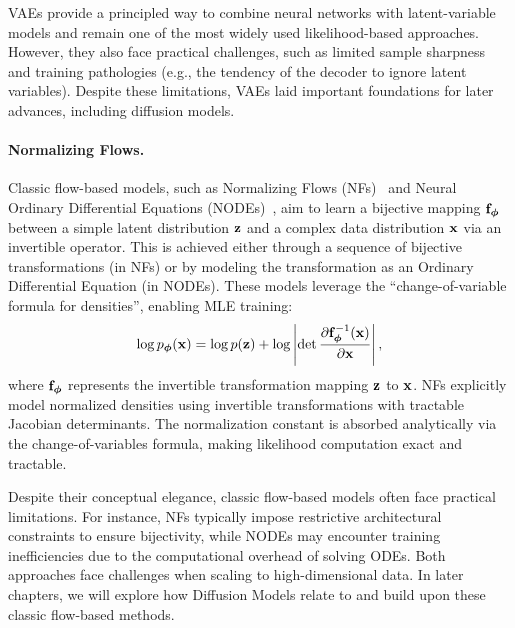 VAEs provide a principled way to combine neural networks with latent-variable models and remain one of the most widely used likelihood-based approaches. 
However, they also face practical challenges, such as limited sample sharpness and training pathologies (e.g., the tendency of the decoder to ignore latent variables). 
Despite these limitations, VAEs laid important foundations for later advances, including diffusion models.






\paragraph{Normalizing Flows.}
Classic flow-based models, such as Normalizing Flows (NFs)~\citep{rezende2015variational} and Neural Ordinary Differential Equations (NODEs)~\citep{chen2018neural}, aim to learn a bijective mapping ${\mathbf{f}}_{\bm{\phi}}$ between a simple latent distribution $ {\mathbf{z}} $ and a complex data distribution $ {\mathbf{x}} $ via an invertible operator. This is achieved either through a sequence of bijective transformations (in NFs) or by modeling the transformation as an Ordinary Differential Equation (in NODEs). These models leverage the ``change-of-variable formula for densities'', enabling MLE training:
\begin{equation*}
    \log p_{\bm{\phi}}({\mathbf{x}}) = \log p({\mathbf{z}}) + \log \left| \det \frac{\partial {\mathbf{f}}_{\bm{\phi}}^{-1}({\mathbf{x}})}{\partial {\mathbf{x}}} \right|,
\end{equation*}
where $ {\mathbf{f}}_{\bm{\phi}} $ represents the invertible transformation mapping $ {\mathbf{z}} $ to $ {\mathbf{x}} $. NFs explicitly model normalized densities using invertible transformations with tractable Jacobian determinants. The normalization constant is absorbed analytically via the change-of-variables formula, making likelihood computation exact and tractable.

Despite their conceptual elegance, classic flow-based models often face practical limitations. For instance, NFs typically impose restrictive architectural constraints to ensure bijectivity, while NODEs may encounter training inefficiencies due to the computational overhead of solving ODEs. Both approaches face challenges when scaling to high-dimensional data. In later chapters, we will explore how Diffusion Models relate to and build upon these classic flow-based methods.


